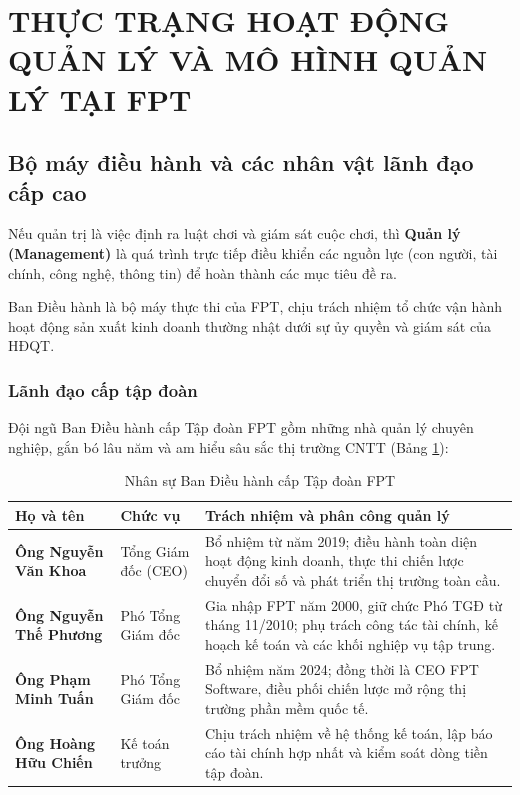\section{THỰC TRẠNG HOẠT ĐỘNG QUẢN LÝ VÀ MÔ HÌNH QUẢN LÝ TẠI FPT}

\subsection{Bộ máy điều hành và các nhân vật lãnh đạo cấp cao}
Nếu quản trị là việc định ra luật chơi và giám sát cuộc chơi, thì \textbf{Quản lý (Management)} là quá trình trực tiếp điều khiển các nguồn lực (con người, tài chính, công nghệ, thông tin) để hoàn thành các mục tiêu đề ra.

Ban Điều hành là bộ máy thực thi của FPT, chịu trách nhiệm tổ chức vận hành hoạt động sản xuất kinh doanh thường nhật dưới sự ủy quyền và giám sát của HĐQT.

\subsubsection{Lãnh đạo cấp tập đoàn}
Đội ngũ Ban Điều hành cấp Tập đoàn FPT gồm những nhà quản lý chuyên nghiệp, gắn bó lâu năm và am hiểu sâu sắc thị trường CNTT (Bảng \ref{tab:ban_dieu_hanh}):

\begin{table}[htbp]
\centering
\caption{Nhân sự Ban Điều hành cấp Tập đoàn FPT}
\label{tab:ban_dieu_hanh}
\begin{tabularx}{\textwidth}{p{4.2cm} p{4.0cm} X}
\toprule
\textbf{Họ và tên} & \textbf{Chức vụ} & \textbf{Trách nhiệm và phân công quản lý} \\
\midrule
\textbf{Ông Nguyễn Văn Khoa} & Tổng Giám đốc (CEO) & Bổ nhiệm từ năm 2019; điều hành toàn diện hoạt động kinh doanh, thực thi chiến lược chuyển đổi số và phát triển thị trường toàn cầu. \\
\textbf{Ông Nguyễn Thế Phương} & Phó Tổng Giám đốc & Gia nhập FPT năm 2000, giữ chức Phó TGĐ từ tháng 11/2010; phụ trách công tác tài chính, kế hoạch kế toán và các khối nghiệp vụ tập trung. \\
\textbf{Ông Phạm Minh Tuấn} & Phó Tổng Giám đốc & Bổ nhiệm năm 2024; đồng thời là CEO FPT Software, điều phối chiến lược mở rộng thị trường phần mềm quốc tế. \\
\textbf{Ông Hoàng Hữu Chiến} & Kế toán trưởng & Chịu trách nhiệm về hệ thống kế toán, lập báo cáo tài chính hợp nhất và kiểm soát dòng tiền tập đoàn. \\
\bottomrule
\end{tabularx}
\end{table}

